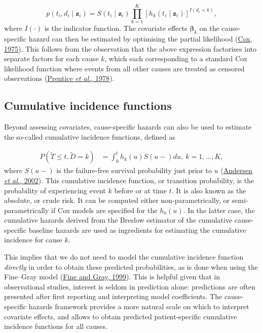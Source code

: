 \documentclass[
  letterpaper,
  DIV=11,
  numbers=noendperiod]{scrreprt}
\begin{document}
\begin{equation}
    \label{eq:likelihood}
    p(t_i, d_i \mid \mathbf{z}_i) = S(t_i \mid \mathbf{z}_i) \prod_{k=1}^{K} \left[ h_k(t_i \mid \mathbf{z}_i) \right]^{I(d_i=k)},
\end{equation} where \(I(\cdot)\) is the indicator function. The
covariate effects \(\boldsymbol{\beta}_k\) on the cause-specific hazard
can then be estimated by optimising the partial likelihood
(\protect\hyperlink{ref-coxPartialLikelihood1975}{Cox, 1975}). This
follows from the observation that the above expression factorises into
separate factors for each cause \(k\), which each corresponding to a
standard Cox likelihood function where events from all other causes are
treated as censored observations
(\protect\hyperlink{ref-prenticeAnalysisFailureTimes1978}{Prentice
\emph{et al.}, 1978}).

\hypertarget{cumulative-incidence-functions}{%
\subsection{Cumulative incidence
functions}\label{cumulative-incidence-functions}}

Beyond assessing covariates, cause-specific hazards can also be used to
estimate the so-called cumulative incidence functions, defined as

\begin{align}
    P(\tilde{T} \leq t, \tilde{D} = k) &= \int_{0}^{t}h_k(u)S(u-)du, \ k=1,...,K,
\end{align} where \(S(u-)\) is the failure-free survival probability
just prior to \(u\)
(\protect\hyperlink{ref-andersenCompetingRisksMultistate2002}{Andersen
\emph{et al.}, 2002}). This cumulative incidence function, or transition
probability, is the probability of experiencing event \(k\) before or at
time \(t\). It is also known as the absolute, or crude risk. It can be
computed either non-parametrically, or semi-parametrically if Cox models
are specified for the \(h_k(u)\). In the latter case, the cumulative
hazards derived from the Breslow estimator of the cumulative
cause-specific baseline hazards are used as ingredients for estimating
the cumulative incidence for cause \(k\).

This implies that we do not need to model the cumulative incidence
function \emph{directly} in order to obtain these predicted
probabilities, as is done when using the Fine--Gray model
(\protect\hyperlink{ref-fineProportionalHazardsModel1999}{Fine and Gray,
1999}). This is helpful given that in observational studies, interest is
seldom in prediction alone: predictions are often presented after first
reporting and interpreting model coefficients. The cause-specific
hazards framework provides a more natural scale on which to interpret
covariate effects, and allows to obtain predicted patient-specific
cumulative incidence functions for all causes.
\end{document}

